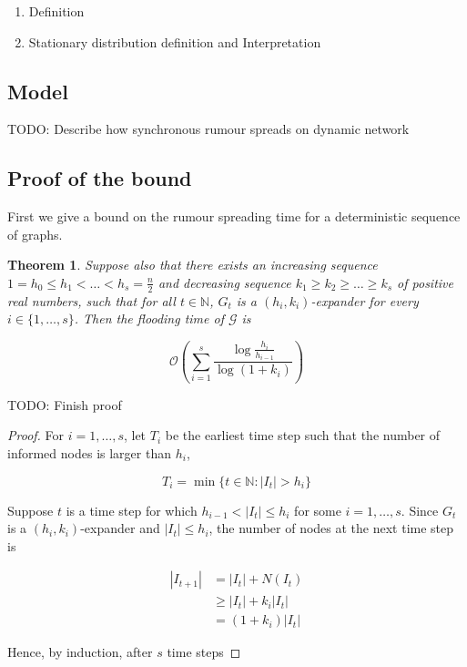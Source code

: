 \documentclass[a4paper,11pt]{article}
\newtheorem{theorem}{Theorem}[section]
\theoremstyle{definition}
\begin{document}
\begin{enumerate}
	\item Definition
	\item Stationary distribution definition and Interpretation
\end{enumerate}

\subsection{Model}

TODO: Describe how synchronous rumour spreads on dynamic network

\subsection{Proof of the bound}

First we give a bound on the rumour spreading time for a deterministic sequence of graphs. 

\begin{theorem}
	\ModelIntro Suppose also that there exists an increasing sequence $1 = h_0 \leq h_1 < \dots < h_s = \frac{n}{2}$ and decreasing sequence $k_1 \geq k_2 \geq \dots \geq k_s$ of positive real numbers, such that for all $t \in \mathbb{N}$, $G_t$ is a $(h_i, k_i)$-expander for every $i \in \{1, \dots , s\}$. Then the flooding time of $\mathcal{G}$ is

	$$
		\mathcal{O}\left(\sum_{i=1}^s \frac{\log \frac{h_i}{h_{i-1}}}{\log(1+k_i)}\right)
	$$
\end{theorem}

TODO: Finish proof

\begin{proof}
	For $i = 1,\dots, s$, let $T_i$ be the earliest time step such that the number of informed nodes is larger than $h_i$,

	$$
		T_i = \min \{ t \in \mathbb{N} : |I_t| > h_i \}
	$$

	Suppose $t$ is a time step for which $h_{i-1} < |I_t| \leq h_i$ for some $i = 1,\dots, s$. Since $G_t$ is a $(h_i, k_i)$-expander and $|I_t| \leq h_i$, the number of nodes at the next time step is 
	
	\begin{align*}
		|I_{t+1}| &= |I_t| + N(I_t) \\
		& \geq |I_t| + k_i |I_t| \\
		& = (1 + k_i)|I_t|
	\end{align*}

	Hence, by induction, after $s$ time steps



\end{proof}
\end{document}
